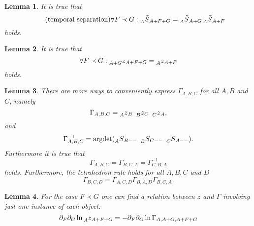 \documentclass[oneside,reqno,12pt]{amsart}
\newtheorem{lemma}{Lemma}
\begin{document}
\begin{lemma}\label{lemma:temp_sep}
It is true that
\begin{equation}\label{temp_sep}\tag{temporal separation}
\forall F\prec G: \prescript{}{A}{\tilde{S}}_{A+F+G}=\prescript{}{A}{\tilde{S}}_{A+G}\prescript{}{A}{\tilde{S}}_{A+F}
\end{equation}
holds.
\end{lemma}

\begin{lemma}\label{lemma:z_temp_sep}
It is true that
\begin{equation}\label{z_temp_sep}
\forall F\prec G: \prescript{}{A+G}{z}_{A+F+G}=\prescript{}{A}{z}_{A+F}
\end{equation}
holds.
\end{lemma}

\begin{lemma}\label{lemma:gamma}
There are more ways to conveniently express \(\Gamma_{A,B,C}\) for all \(A,B\) and \(C\), namely
\begin{equation}\label{gamma_to_z}
\Gamma_{A,B,C}=\prescript{}{A}{z}_{B} ~\prescript{}{B}{z}_{C}~\prescript{}{C}{z}_A,
\end{equation}
and
\begin{equation}\label{gamma_by_argdet}
\Gamma^{-1}_{A,B,C}= \text{argdet}(\prescript{}{A}{S}_{B --} ~ \prescript{}{B}{S}_{C --} ~\prescript{}{C}{S}_{A --}).
\end{equation}
Furthermore it is true that
\begin{equation}\label{gamma_cycle}
\Gamma_{A,B,C}=\Gamma_{B,C,A}=\Gamma^{-1}_{C,B,A}
\end{equation}
holds. Furthermore, the tetrahedron rule holds for all \(A,B,C\) and \(D\)
\begin{equation}\label{gamma_tetrahedron}
\Gamma_{B,C,D}=\Gamma_{A,C,D}\Gamma_{B,A,D} \Gamma_{B,C,A}.
\end{equation}

\end{lemma}

\begin{lemma}\label{lemma:z_gamma_causal}
For the case \(F\prec G\) one can find a relation between \(z\) and \(\Gamma\) involving just one instance of each object:
\begin{equation}
\partial_F \partial_G \ln \prescript{}{A}{z}_{A+F+G} = - \partial_F \partial_G \ln \Gamma_{A,A+G,A+F+G}
\end{equation}

\end{lemma}
\end{document}
